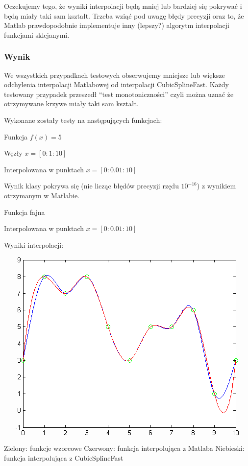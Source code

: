 \documentclass[a4paper,11pt,notitlepage]{article}
\begin{document}
Oczekujemy tego, że wyniki interpolacji będą mniej lub bardziej się pokrywać i będą miały taki sam kształt. Trzeba wziąć pod uwagę błędy precyzji oraz to, że Matlab prawdopodobnie implementuje inny (lepszy?) algorytm interpolacji funkcjami sklejanymi.

\subsubsection{Wynik}

We wszystkich przypadkach testowych obserwujemy mniejsze lub większe odchylenia interpolacji Matlabowej od interpolacji CubicSplineFast. Każdy testowany przypadek przeszedł ``test monotoniczności'' czyli można uznać że otrzymywane krzywe miały taki sam kształt.

Wykonane zostały testy na następujących funkcjach:

Funkcja $f(x) = 5$

Węzły $x = [0:1:10]$

Interpolowana w punktach $x = [0:0.01:10]$

Wynik klasy pokrywa się (nie licząc błędów precyzji rzędu $10^{-16}$) z wynikiem otrzymanym w Matlabie.

Funkcja fajna


Interpolowana w punktach $x = [0:0.01:10]$

Wyniki interpolacji:\\
\includegraphics{spline2.png}
Zielony: funkcje wzorcowe
Czerwony: funkcja interpolująca z Matlaba
Niebieski: funkcja interpolująca z CubicSplineFast
\end{document}
